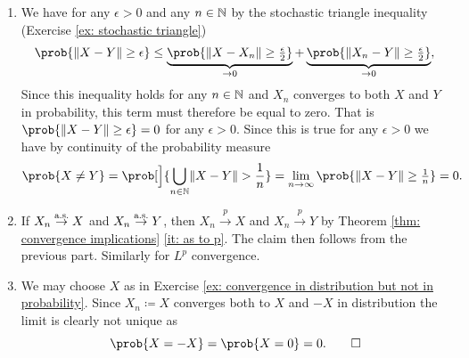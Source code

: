 \begin{solution}
\begin{enumerate}[wide=0pt]
    \item[\ref{it: (unique limits) stochastic}]
    We have for any \(\epsilon > 0\) and any \(n\in \mathbb{N}\) by the
    stochastic triangle inequality (Exercise \ref{ex: stochastic
    triangle})
    \[\begin{aligned}
        \prob{\norm{X - Y} \ge \epsilon}
        \le \underbrace{\prob{\norm{X - X_n} \ge \tfrac\epsilon2}}_{\to 0} + \underbrace{\prob{\norm{X_n - Y} \ge \tfrac\epsilon2}}_{\to 0},
    \end{aligned}
    \]
    Since this inequality holds for any \(n\in \mathbb{N}\) and \(X_n\)
    converges to both \(X\) and \(Y\) in probability, this term must
    therefore be equal to zero. That is \(\prob{\norm{X - Y} \ge
    \epsilon} = 0\) for any \(\epsilon > 0\). Since this is true for any
    \(\epsilon > 0\) we have by continuity of the probability measure
    \[
        \prob{X \neq Y} = \prob[\Big]{\bigcup_{n\in \nat}\norm{X - Y} > \frac1n} = \lim_{n\to\infty} \prob{\norm{X - Y} \ge \tfrac1n} = 0.
    \]

    \item[\ref{it: (unique limits) a.s.} and \ref{it: (unique limits) Lp}]
    If \(X_n \overset{\operatorname{\text{a.s.}}}\to X\) and \(X_n \overset{\operatorname{\text{a.s.}}}\to Y\), then
    \(X_n \overset{p}\to X\) and \(X_n \overset{p}\to Y\) by Theorem
    \ref{thm: convergence implications} \ref{it: as to p}. The claim
    then follows from the previous part. Similarly for \(L^p\) convergence.

    \item[\ref{it: non-unique limits convergence in dist}]
    We may choose \(X\) as in Exercise \ref{ex: convergence in distribution but not in probability}.
    Since \(X_n \coloneq X\) converges both to \(X\) and \(-X\) in
    distribution the limit is clearly not unique as
    \[
        \prob{X = -X} = \prob{X=0}= 0.
        \qedhere
    \]
\end{enumerate}
\end{solution}

